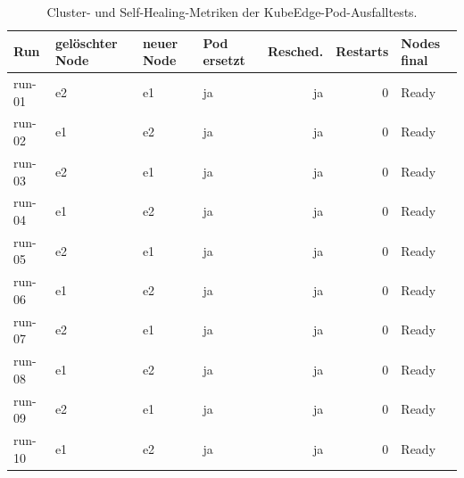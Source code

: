 \begin{table}[H]
\centering
\begin{tabular}{llllrrl}
\toprule
\textbf{Run} & \textbf{gelöschter Node} & \textbf{neuer Node} & \textbf{Pod ersetzt} & \textbf{Resched.} & \textbf{Restarts} & \textbf{Nodes final} \\
\midrule
run-01 & e2 & e1 & ja & ja & 0 & Ready \\
run-02 & e1 & e2 & ja & ja & 0 & Ready \\
run-03 & e2 & e1 & ja & ja & 0 & Ready \\
run-04 & e1 & e2 & ja & ja & 0 & Ready \\
run-05 & e2 & e1 & ja & ja & 0 & Ready \\
run-06 & e1 & e2 & ja & ja & 0 & Ready \\
run-07 & e2 & e1 & ja & ja & 0 & Ready \\
run-08 & e1 & e2 & ja & ja & 0 & Ready \\
run-09 & e2 & e1 & ja & ja & 0 & Ready \\
run-10 & e1 & e2 & ja & ja & 0 & Ready \\
\bottomrule
\end{tabular}
\caption{Cluster- und Self-Healing-Metriken der KubeEdge-Pod-Ausfalltests.}
\label{tab:appendix-kubeedge-pod-failure-cluster}
\end{table}
